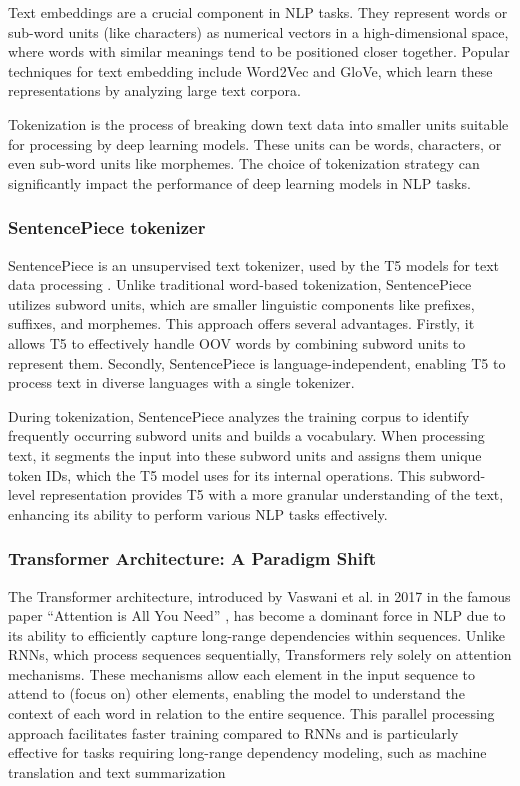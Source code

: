 \documentclass[15pt]{article}
\begin{document}
Text embeddings are a crucial component in NLP tasks. They represent words or sub-word units (like characters) as numerical vectors in a high-dimensional space, where words with similar meanings tend to be positioned closer together. Popular techniques for text embedding include Word2Vec and GloVe, which learn these representations by analyzing large text corpora.

Tokenization is the process of breaking down text data into smaller units suitable for processing by deep learning models. These units can be words, characters, or even sub-word units like morphemes. The choice of tokenization strategy can significantly impact the performance of deep learning models in NLP tasks.

\subsubsection{SentencePiece tokenizer}

SentencePiece is an unsupervised text tokenizer, used by the T5 models for text data processing \cite{Kudo2018}. Unlike traditional word-based tokenization, SentencePiece utilizes subword units, which are smaller linguistic components like prefixes, suffixes, and morphemes. This approach offers several advantages. Firstly, it allows T5 to effectively handle OOV words by combining subword units to represent them. Secondly, SentencePiece is language-independent, enabling T5 to process text in diverse languages with a single tokenizer.

During tokenization, SentencePiece analyzes the training corpus to identify frequently occurring subword units and builds a vocabulary. When processing text, it segments the input into these subword units and assigns them unique token IDs, which the T5 model uses for its internal operations. This subword-level representation provides T5 with a more granular understanding of the text, enhancing its ability to perform various NLP tasks effectively.

\subsubsection{Transformer Architecture: A Paradigm Shift}

The Transformer architecture, introduced by Vaswani et al. in 2017 in the famous paper “Attention is All You Need” \cite{Vaswani2017}, has become a dominant force in NLP due to its ability to efficiently capture long-range dependencies within sequences. Unlike RNNs, which process sequences sequentially, Transformers rely solely on attention mechanisms. These mechanisms allow each element in the input sequence to attend to (focus on) other elements, enabling the model to understand the context of each word in relation to the entire sequence. This parallel processing approach facilitates faster training compared to RNNs and is particularly effective for tasks requiring long-range dependency modeling, such as machine translation and text summarization
\end{document}
